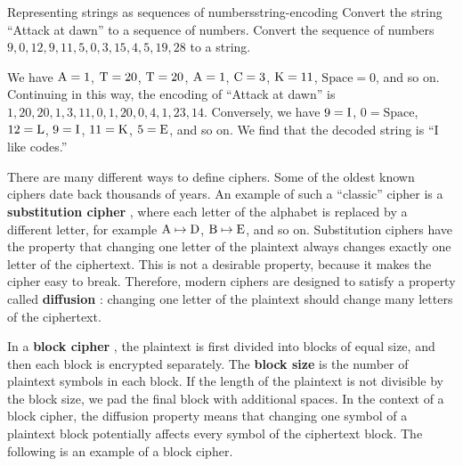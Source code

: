 \documentclass{ximera}
\begin{document}
\begin{example}{Representing strings as sequences of numbers}{string-encoding}
  Convert the string ``Attack at dawn'' to a sequence of
  numbers. Convert the sequence of numbers
  $9,0,12,9,11,5,0,3,15,4,5,19,28$ to a string.
\end{example}

\begin{solution}
  We have $\text{A}=1$, $\text{T}=20$, $\text{T}=20$, $\text{A}=1$, $\text{C}=3$,
  $\text{K}=11$, $\mbox{Space}=0$, and so on. Continuing in this way, the
  encoding of ``Attack at dawn'' is
  $1,20,20,1,3,11,0,1,20,0,4,1,23,14$.  Conversely, we have $9=\text{I}$,
  $0=\mbox{Space}$, $12=\text{L}$, $9=\text{I}$, $11=\text{K}$, $5=\text{E}$, and so
  on. We find that the decoded string is ``I like codes.''
\end{solution}

There are many different ways to define ciphers. Some of the oldest
known ciphers date back thousands of years.  An example of such a
``classic'' cipher is a \textbf{substitution cipher}%
%
, where each letter of the alphabet
is replaced by a different letter, for example $\text{A}\mapsto\text{D}$,
$\text{B}\mapsto\text{E}$, and so on. Substitution ciphers have the property
that changing one letter of the plaintext always changes exactly one
letter of the ciphertext. This is not a desirable property, because it
makes the cipher easy to break. Therefore, modern ciphers are designed
to satisfy a property called \textbf{diffusion}%
%
: changing one letter of the plaintext should
change many letters of the ciphertext.

In a \textbf{block cipher}%
%
, the plaintext is first divided into
blocks of equal size, and then each block is encrypted separately. The
\textbf{block size}%
 is the number of plaintext symbols in each
block. If the length of the plaintext is not divisible by the block
size, we pad the final block with additional spaces. In the context of
a block cipher, the diffusion property means that changing one symbol
of a plaintext block potentially affects every symbol of the
ciphertext block. The following is an example of a block cipher.
\end{document}
